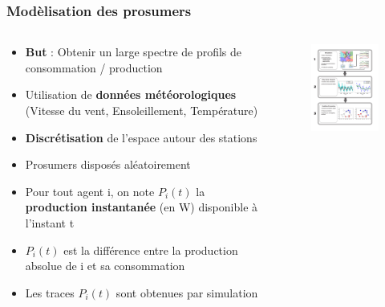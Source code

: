 \documentclass[xcolor=dvipsnames]{beamer}
\begin{document}
%
%
\begin{frame}
	\frametitle{Modèlisation des prosumers}

\begin{columns}
	\begin{column}{.5\textwidth}
		\begin{footnotesize}
			\begin{itemize}
				\item \textbf{But} : Obtenir un large spectre de profils de consommation / production
				\item Utilisation de \textbf{données météorologiques} (Vitesse du vent, Ensoleillement, Température)
				\item \textbf{Discrétisation} de l'espace autour des stations 
				\item Prosumers disposés aléatoirement 
				\item Pour tout agent i, on note $ P_{i}(t) $ la \textbf{production instantanée} (en W) disponible à l'instant t
				\item $ P_{i}(t) $ est la différence entre la production absolue de i et sa consommation
				\item Les traces $ P_{i}(t) $ sont obtenues par simulation
			\end{itemize}
		\end{footnotesize}
	\end{column}
	\begin{column}{.5\textwidth}
		\begin{figure}
			\includegraphics[width=6.1cm]{fig2.pdf}
		\end{figure}
	\end{column}
\end{columns}

\end{frame}
\end{document}
